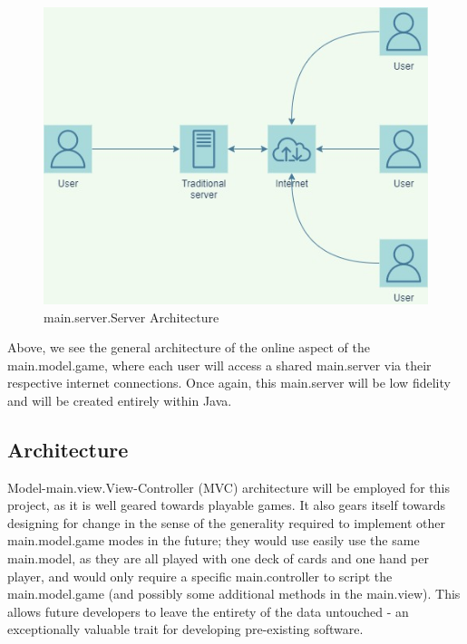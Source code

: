 \documentclass[12pt, titlepage]{article}
\begin{document}
    \begin{figure}
        \includegraphics[width=14cm]{implementation_environment (1).jpg}
        \caption{main.server.Server Architecture}
    \end{figure}

\bigskip

Above, we see the general architecture of the online aspect of the main.model.game, where each user will access a shared main.server via their respective internet connections. Once again, this main.server will be low fidelity and will be created entirely within Java.

\subsection{Architecture}

Model-main.view.View-Controller (MVC) architecture will be employed for this project, as it is well geared towards playable games. It also gears itself towards designing for change in the sense of the generality required to implement other main.model.game modes in the future; they would use easily use the same main.model, as they are all played with one deck of cards and one hand per player, and would only require a specific main.controller to script the main.model.game (and possibly some additional methods in the main.view). This allows future developers to leave the entirety of the data untouched - an exceptionally valuable trait for developing pre-existing software.
\end{document}
